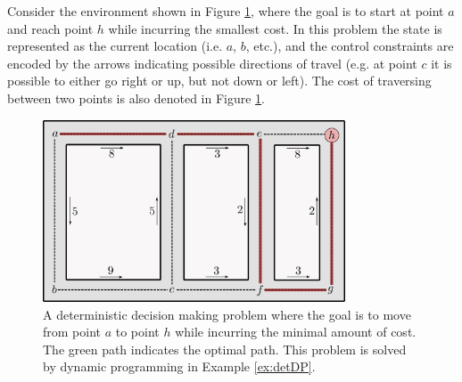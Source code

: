 \begin{example} \label{ex:detDP}
\theoremstyle{definition}
Consider the environment shown in Figure \ref{fig:detDPprob}, where the goal is to start at point $a$ and reach point $h$ while incurring the smallest cost. In this problem the state is represented as the current location (i.e. $a$, $b$, etc.), and the control constraints are encoded by the arrows indicating possible directions of travel (e.g. at point $c$ it is possible to either go right or up, but not down or left). The cost of traversing between two points is also denoted in Figure \ref{fig:detDPprob}.
\begin{figure}[ht]
    \centering
    \includegraphics[width=0.8\textwidth]{tex/figs/ch22_figs/dpexample.png}
    \caption{A deterministic decision making problem where the goal is to move from point $a$ to point $h$ while incurring the minimal amount of cost. The green path indicates the optimal path. This problem is solved by dynamic programming in Example \ref{ex:detDP}.}
    \label{fig:detDPprob}
\end{figure}


\end{example}
